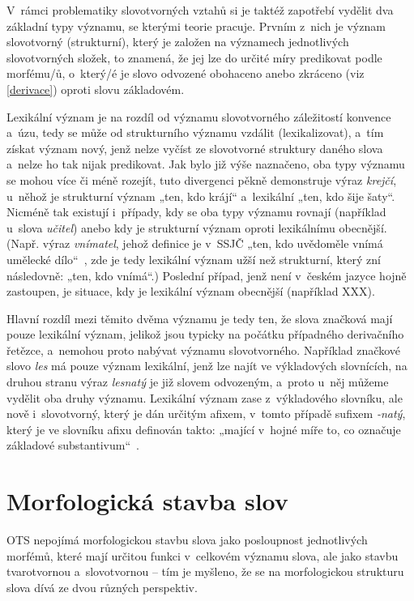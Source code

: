 V~rámci problematiky slovotvorných vztahů si je taktéž zapotřebí vydělit
dva základní typy významu, se kterými teorie pracuje. Prvním z~nich je
význam slovotvorný (strukturní), který je založen na významech
jednotlivých slovotvorných složek, to znamená, že jej lze do určité míry
predikovat podle morfému/ů, o~který/é je slovo odvozené obohaceno anebo
zkráceno (viz \ref{derivace}) oproti slovu základovém.
\parencite{enc-slovot-vyznam17}

Lexikální význam je na rozdíl od významu slovotvorného záležitostí
konvence a~úzu, tedy se může od strukturního významu vzdálit
(lexikalizovat), a~tím získat význam nový, jenž nelze vyčíst ze
slovotvorné struktury daného slova a~nelze ho tak nijak predikovat.
\parencite{enc-slovot-vyznam17} Jak bylo již výše naznačeno, oba typy
významu se mohou více či méně rozejít, tuto divergenci pěkně demonstruje
výraz \emph{krejčí}, u~něhož je strukturní význam „ten, kdo krájí``
a~lexikální „ten, kdo šije šaty``. Nicméně tak existují i~případy, kdy se
oba typy významu rovnají (například u~slova \emph{učitel}) anebo kdy je
strukturní význam oproti lexikálnímu obecnější. (Např. výraz
\emph{vnímatel}, jehož definice je v~SSJČ „ten, kdo uvědoměle vnímá
umělecké dílo``~\parencite{ssjc}, zde je tedy lexikální význam užší než
strukturní, který zní následovně: „ten, kdo vnímá``.) Poslední případ,
jenž není v~českém jazyce hojně zastoupen, je situace, kdy je lexikální
význam obecnější (například XXX).

Hlavní rozdíl mezi těmito dvěma významu je tedy ten, že slova značková
mají pouze lexikální význam, jelikož jsou typicky na počátku případného
derivačního řetězce, a~nemohou proto nabývat významu slovotvorného.
Například značkové slovo \emph{les} má pouze význam lexikální, jenž lze
najít ve výkladových slovnících, na druhou stranu výraz \emph{lesnatý}
je již slovem odvozeným, a~proto u~něj můžeme vydělit oba druhy významu.
Lexikální význam zase z~výkladového slovníku, ale nově i~slovotvorný,
který je dán určitým afixem, v~tomto případě sufixem \emph{-natý}, který
je ve slovníku afixu definován takto: „mající v~hojné míře to, co
označuje základové substantivum``~\parencite{simandl2016}.

\hypertarget{morfologickuxe1-stavba-slov}{%
\section{Morfologická stavba
slov}\label{morfologickuxe1-stavba-slov}}

OTS nepojímá morfologickou stavbu slova jako posloupnost jednotlivých
morfémů, které mají určitou funkci v~celkovém významu slova, ale jako
stavbu tvarotvornou a~slovotvornou -- tím je myšleno, že se na
morfologickou strukturu slova dívá ze dvou různých perspektiv.
\parencite[118]{dokulil62}

